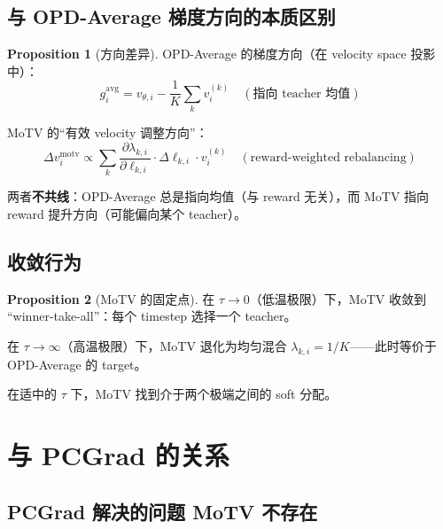 \documentclass[11pt,a4paper]{article}
\theoremstyle{definition}
\newtheorem{proposition}{Proposition}
\begin{document}
\subsection{与 OPD-Average 梯度方向的本质区别}

\begin{proposition}[方向差异]
\label{prop:direction_diff}
OPD-Average 的梯度方向（在 velocity space 投影中）：
\begin{equation}
g^{\mathrm{avg}}_i = v_{\theta,i} - \frac{1}{K}\sum_k v^{(k)}_i \quad (\text{指向 teacher 均值})
\end{equation}

MoTV 的``有效 velocity 调整方向''：
\begin{equation}
\Delta v_i^{\mathrm{motv}} \propto \sum_k \frac{\partial \lambda_{k,i}}{\partial \ell_{k,i}} \cdot \Delta\ell_{k,i} \cdot v^{(k)}_i \quad (\text{reward-weighted rebalancing})
\end{equation}

两者\textbf{不共线}：OPD-Average 总是指向均值（与 reward 无关），而 MoTV 指向 reward 提升方向（可能偏向某个 teacher）。
\end{proposition}

\subsection{收敛行为}

\begin{proposition}[MoTV 的固定点]
在 $\tau \to 0$（低温极限）下，MoTV 收敛到 ``winner-take-all''：每个 timestep 选择一个 teacher。

在 $\tau \to \infty$（高温极限）下，MoTV 退化为均匀混合 $\lambda_{k,i} = 1/K$——此时等价于 OPD-Average 的 target。

在适中的 $\tau$ 下，MoTV 找到介于两个极端之间的 soft 分配。
\end{proposition}

\section{与 PCGrad 的关系}
\label{sec:vs_pcgrad}

\subsection{PCGrad 解决的问题 MoTV 不存在}
\end{document}
